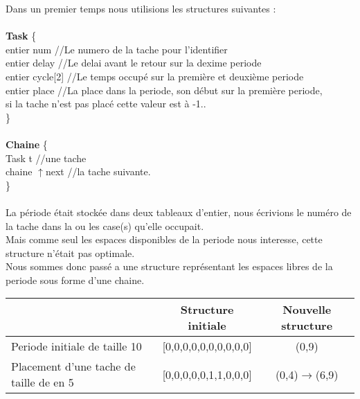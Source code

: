 \documentclass[11pt]{article}
\begin{document}
Dans un premier temps nous utilisions les structures suivantes :\\\\
\indent \textbf{Task} \{ \\
    \indent \indent entier num \indent\indent//Le numero de la tache pour l'identifier\\
    \indent \indent entier delay \indent\indent//Le delai avant le retour sur la dexime periode\\
    \indent \indent entier cycle[2] \indent//Le temps occupé sur la première et deuxième periode\\
    \indent \indent entier place \indent\indent//La place dans la periode, son début sur la première periode,\\
    \indent \indent \indent \indent \indent \indent \indent \indent si la tache n'est pas placé cette valeur est à -1..\\
\indent\}
\\\\
\indent \textbf{Chaine} \{ \\
    \indent \indent Task t   \indent \indent \indent //une tache\\
    \indent \indent chaine $\uparrow$next \indent //la tache suivante.\\
\indent\}
\\\\
\indent La période était stockée dans deux tableaux d'entier, nous écrivions le numéro de la tache dans la ou les case(s) qu'elle occupait.\\
Mais comme seul les espaces disponibles de la periode nous interesse, cette structure n'était pas optimale.\\
Nous sommes donc passé a une structure représentant les espaces libres de la periode sous forme d'une chaine.
\begin{center}
    \begin{tabular}{|l|c|c|}			
    \hline                                              & \textbf{Structure initiale}   & \textbf{Nouvelle structure} \\
    \hline 	Periode initiale de taille 10               & [0,0,0,0,0,0,0,0,0,0]         &(0,9)		     \\
    \hline 	Placement d'une tache de taille de en 5 	& [0,0,0,0,0,1,1,0,0,0] 		& (0,4)$\rightarrow$(6,9)   \\
    \hline
    \end{tabular}\vspace{1em}
\end{center}
\end{document}
